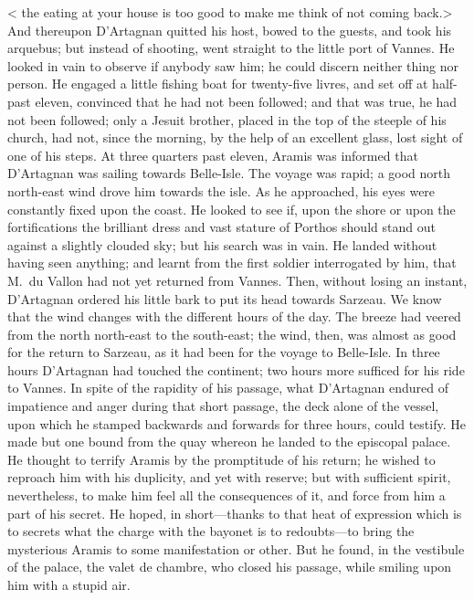 < the eating at your house is too good to make me think of not coming back.> And thereupon D'Artagnan quitted his host, bowed to the guests, and took his arquebus; but instead of shooting, went straight to the little port of Vannes. He looked in vain to observe if anybody saw him; he could discern neither thing nor person. He engaged a little fishing boat for twenty-five livres, and set off at half-past eleven, convinced that he had not been followed; and that was true, he had not been followed; only a Jesuit brother, placed in the top of the steeple of his church, had not, since the morning, by the help of an excellent glass, lost sight of one of his steps. At three quarters past eleven, Aramis was informed that D'Artagnan was sailing towards Belle-Isle. The voyage was rapid; a good north north-east wind drove him towards the isle. As he approached, his eyes were constantly fixed upon the coast. He looked to see if, upon the shore or upon the fortifications the brilliant dress and vast stature of Porthos should stand out against a slightly clouded sky; but his search was in vain. He landed without having seen anything; and learnt from the first soldier interrogated by him, that M.~du Vallon had not yet returned from Vannes. Then, without losing an instant, D'Artagnan ordered his little bark to put its head towards Sarzeau. We know that the wind changes with the different hours of the day. The breeze had veered from the north north-east to the south-east; the wind, then, was almost as good for the return to Sarzeau, as it had been for the voyage to Belle-Isle. In three hours D'Artagnan had touched the continent; two hours more sufficed for his ride to Vannes. In spite of the rapidity of his passage, what D'Artagnan endured of impatience and anger during that short passage, the deck alone of the vessel, upon which he stamped backwards and forwards for three hours, could testify. He made but one bound from the quay whereon he landed to the episcopal palace. He thought to terrify Aramis by the promptitude of his return; he wished to reproach him with his duplicity, and yet with reserve; but with sufficient spirit, nevertheless, to make him feel all the consequences of it, and force from him a part of his secret. He hoped, in short—thanks to that heat of expression which is to secrets what the charge with the bayonet is to redoubts—to bring the mysterious Aramis to some manifestation or other. But he found, in the vestibule of the palace, the valet de chambre, who closed his passage, while smiling upon him with a stupid air.

